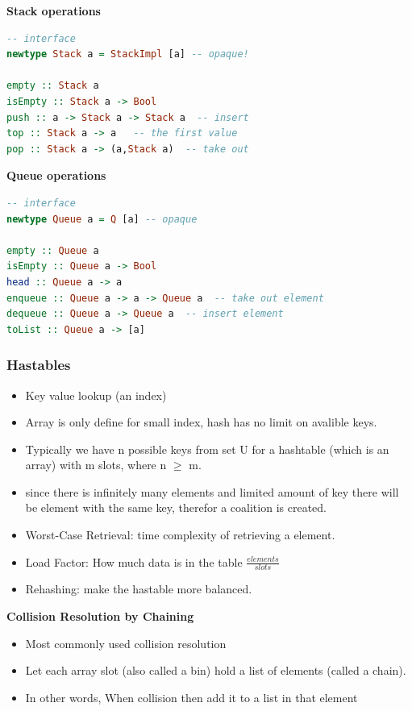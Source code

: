 \noindent\textbf{Stack operations}
\begin{lstlisting}[language=Haskell]
-- interface
newtype Stack a = StackImpl [a] -- opaque!

empty :: Stack a
isEmpty :: Stack a -> Bool
push :: a -> Stack a -> Stack a  -- insert
top :: Stack a -> a   -- the first value
pop :: Stack a -> (a,Stack a)  -- take out
\end{lstlisting}
\newpage

\noindent\textbf{Queue operations}
\begin{lstlisting}[language=Haskell]
-- interface
newtype Queue a = Q [a] -- opaque

empty :: Queue a  
isEmpty :: Queue a -> Bool
head :: Queue a -> a 
enqueue :: Queue a -> a -> Queue a  -- take out element
dequeue :: Queue a -> Queue a  -- insert element
toList :: Queue a -> [a] 
\end{lstlisting}


\subsubsection{Hastables}
\begin{itemize}
\item  Key value lookup (an index) 
\item  Array is only define for small index, hash has no limit on avalible keys.
\item  Typically we have n possible keys from set U for a hashtable (which is an array)
  with m slots, where n $\geq$ m.
\item  since there is infinitely many elements and limited amount of key there will be element with
  the  same key, therefor a coalition is created.
\item  Worst-Case Retrieval: time complexity of retrieving a element.
\item  Load Factor: How much data is in the table $\frac{elements}{slots}$
\item  Rehashing: make the hastable more balanced. 
\end{itemize}

\noindent\textbf{Collision Resolution by Chaining}
\begin{itemize}
\item Most commonly used collision resolution
\item Let each array slot (also called a bin) hold a list of elements (called a chain).
\item In other words, When collision then add it to a list in that element
\end{itemize}


